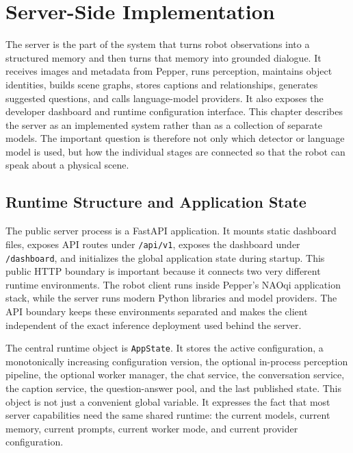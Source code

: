 \chapter{Server-Side Implementation}\label{chap:server_side_rewrite}

The server is the part of the system that turns robot observations into a structured memory and then turns that memory into grounded dialogue. It receives images and metadata from Pepper, runs perception, maintains object identities, builds scene graphs, stores captions and relationships, generates suggested questions, and calls language-model providers. It also exposes the developer dashboard and runtime configuration interface. This chapter describes the server as an implemented system rather than as a collection of separate models. The important question is therefore not only which detector or language model is used, but how the individual stages are connected so that the robot can speak about a physical scene.

\section{Runtime Structure and Application State}\label{sec:server-runtime-structure}

The public server process is a FastAPI application. It mounts static dashboard files, exposes API routes under \texttt{/api/v1}, exposes the dashboard under \texttt{/dashboard}, and initializes the global application state during startup. This public HTTP boundary is important because it connects two very different runtime environments. The robot client runs inside Pepper's NAOqi application stack, while the server runs modern Python libraries and model providers. The API boundary keeps these environments separated and makes the client independent of the exact inference deployment used behind the server.

The central runtime object is \texttt{AppState}. It stores the active configuration, a monotonically increasing configuration version, the optional in-process perception pipeline, the optional worker manager, the chat service, the conversation service, the caption service, the question-answer pool, and the last published state. This object is not just a convenient global variable. It expresses the fact that most server capabilities need the same shared runtime: the current models, current memory, current prompts, current worker mode, and current provider configuration.

